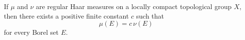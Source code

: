 If $\mu$ and $\nu$ are regular Haar measures on a locally compact topological group $X$, then there exists a positive finite constant $c$ such that
$$
\mu(E) = c\,\nu(E)
$$
for every Borel set $E$.
